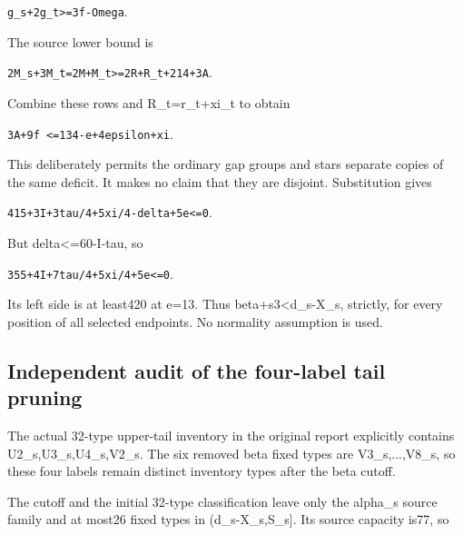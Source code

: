 \documentclass[10pt,a4paper]{article}
\theoremstyle{definition}
\begin{document}
\texttt{g\_\allowbreak{}\allowbreak{}s+\allowbreak{}2g\_\allowbreak{}\allowbreak{}t>=\allowbreak{}3f-Omega}.

The source lower bound is

\texttt{2M\_\allowbreak{}\allowbreak{}s+\allowbreak{}3M\_\allowbreak{}\allowbreak{}t=\allowbreak{}2M+\allowbreak{}M\_\allowbreak{}\allowbreak{}t>=\allowbreak{}2R+\allowbreak{}R\_\allowbreak{}\allowbreak{}t+\allowbreak{}214+\allowbreak{}3A}.

Combine these rows and R\_\allowbreak{}t=\allowbreak{}r\_\allowbreak{}t+\allowbreak{}xi\_\allowbreak{}t to obtain

\texttt{3A+\allowbreak{}9f <=\allowbreak{}134-e+\allowbreak{}4epsilon+\allowbreak{}xi}.

This deliberately permits the ordinary gap groups and stars separate
copies of the same deficit. It makes no claim that they are disjoint.
Substitution gives

\texttt{415+\allowbreak{}3I+\allowbreak{}3tau/\allowbreak{}4+\allowbreak{}5xi/\allowbreak{}4-delta+\allowbreak{}5e<=\allowbreak{}0}.

But delta\textless=\allowbreak{}60-I-tau,\allowbreak{} so

\texttt{355+\allowbreak{}4I+\allowbreak{}7tau/\allowbreak{}4+\allowbreak{}5xi/\allowbreak{}4+\allowbreak{}5e<=\allowbreak{}0}.

Its left side is at least420 at e=\allowbreak{}13. Thus beta+\allowbreak{}s3\textless d\_\allowbreak{}s-X\_\allowbreak{}s,\allowbreak{}
strictly,\allowbreak{} for every position of all selected endpoints. No normality
assumption is used.

\hypertarget{independent-audit-of-the-four-label-tail-pruning}{%
\subsection{Independent audit of the four-label tail
pruning}\label{independent-audit-of-the-four-label-tail-pruning}}

The actual 32-type upper-tail inventory in the original report
explicitly contains U2\_\allowbreak{}s,\allowbreak{}U3\_\allowbreak{}s,\allowbreak{}U4\_\allowbreak{}s,\allowbreak{}V2\_\allowbreak{}s. The six removed beta fixed
types are V3\_\allowbreak{}s,\allowbreak{}...,\allowbreak{}V8\_\allowbreak{}s,\allowbreak{} so these four labels remain distinct
inventory types after the beta cutoff.

The cutoff and the initial 32-type classification leave only the
alpha\_\allowbreak{}s source family and at most26 fixed types in (d\_\allowbreak{}s-X\_\allowbreak{}s,\allowbreak{}S\_\allowbreak{}s{]}.
Its source capacity is77,\allowbreak{} so
\end{document}
